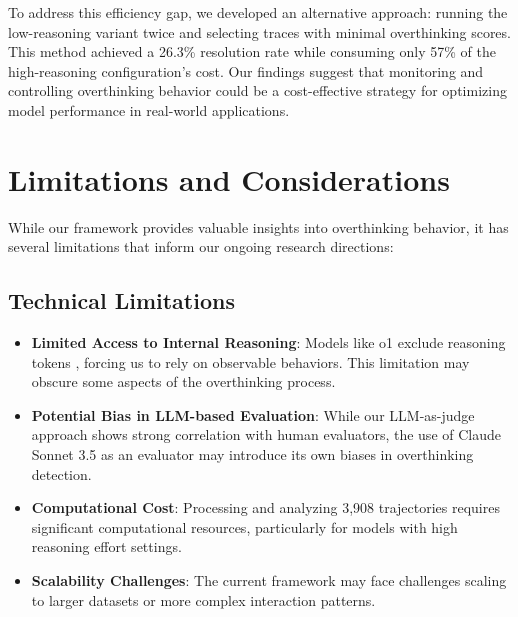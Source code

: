 To address this efficiency gap, we developed an alternative approach: running the low-reasoning variant twice and selecting traces with minimal overthinking scores. This method achieved a 26.3\% resolution rate while consuming only 57\% of the high-reasoning configuration's cost. Our findings suggest that monitoring and controlling overthinking behavior could be a cost-effective strategy for optimizing model performance in real-world applications.

\section{Limitations and Considerations}
\label{sec:limitations}

While our framework provides valuable insights into overthinking behavior, it has several limitations that inform our ongoing research directions:

\subsection{Technical Limitations}
\begin{itemize}
    \item \textbf{Limited Access to Internal Reasoning}: Models like o1 exclude reasoning tokens \cite{openai_learning_to_reason_2024}, forcing us to rely on observable behaviors. This limitation may obscure some aspects of the overthinking process.
    
    \item \textbf{Potential Bias in LLM-based Evaluation}: While our LLM-as-judge approach shows strong correlation with human evaluators, the use of Claude Sonnet 3.5 as an evaluator may introduce its own biases in overthinking detection.
    
    \item \textbf{Computational Cost}: Processing and analyzing 3,908 trajectories requires significant computational resources, particularly for models with high reasoning effort settings.
    
    \item \textbf{Scalability Challenges}: The current framework may face challenges scaling to larger datasets or more complex interaction patterns.
\end{itemize}


